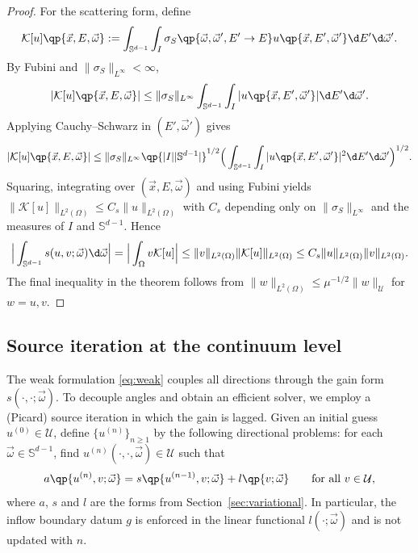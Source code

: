 \documentclass[final]{amsart}
\begin{document}
\begin{proof}
For the scattering form, define
\begin{equation*}
  \mathcal{K}[u]\qp{\vec{x},E,\vec{\omega}}
  :=
  \int_{\mathbb{S}^{d-1}}\int_I
  \sigma_S\qp{\vec{\omega},\vec{\omega}',E'\to E} 
  u\qp{\vec{x},E',\vec{\omega}'} \d E' \d\vec{\omega}'.
\end{equation*}
By Fubini and $\|\sigma_S\|_{L^\infty}<\infty$,
\begin{equation*}
  |\mathcal{K}[u]\qp{\vec{x},E,\vec{\omega}}|
  \le
  \|\sigma_S\|_{L^\infty}\int_{\mathbb{S}^{d-1}}\int_I
  |u\qp{\vec{x},E',\vec{\omega}'}| \d E' \d\vec{\omega}'.
\end{equation*}
Applying Cauchy--Schwarz in $(E',\vec{\omega}')$ gives
\[
  |\mathcal{K}[u]\qp{\vec{x},E,\vec{\omega}}|
  \le
  \|\sigma_S\|_{L^\infty} \qp{|I| |\mathbb S^{d-1}|}^{1/2}
  \Big(\int_{\mathbb{S}^{d-1}}\int_I |u\qp{\vec{x},E',\vec{\omega}'}|^2 \d E' \d\vec{\omega}'\Big)^{1/2}.
\]
Squaring, integrating over $(\vec{x},E,\vec{\omega})$ and using Fubini yields
$\|\mathcal{K}[u]\|_{L^2(\Omega)} \le C_s\|u\|_{L^2(\Omega)}$ with $C_s$ depending only on
$\|\sigma_S\|_{L^\infty}$ and the measures of $I$ and $\mathbb{S}^{d-1}$. Hence
\begin{equation*}
  \Big|\int_{\mathbb{S}^{d-1}} s(u,v;\vec{\omega}) \d\vec{\omega}\Big|
  =
  \Big|\int_\Omega v \mathcal{K}[u]\Big|
  \le
  \|v\|_{L^2(\Omega)}\|\mathcal{K}[u]\|_{L^2(\Omega)}
  \le
  C_s\|u\|_{L^2(\Omega)}\|v\|_{L^2(\Omega)}.
\end{equation*}
The final inequality in the theorem follows from $\|w\|_{L^2(\Omega)}\le \mu^{-1/2}\|w\|_{\mathcal{U}}$ for $w=u,v$.
\end{proof}

\subsection{Source iteration at the continuum level}
\label{sec:SI-continuum}

The weak formulation \eqref{eq:weak} couples all directions through the
gain form $s(\cdot,\cdot;\vec{\omega})$. To decouple angles and obtain
an efficient solver, we employ a (Picard) source iteration in which the
gain is lagged. Given an initial guess $u^{(0)}\in\mathcal{U}$, define
$\{u^{(n)}\}_{n\ge 1}$ by the following directional problems: for each
$\vec{\omega}\in\mathbb{S}^{d-1}$, find
$u^{(n)}(\cdot,\cdot,\vec{\omega})\in\mathcal{U}$ such that
\begin{equation}
  \label{eq:SI-weak}
  a\qp{u^{(n)},v;\vec{\omega}}
  =
  s\qp{u^{(n-1)},v;\vec{\omega}}
  +
  l\qp{v;\vec{\omega}}
  \qquad \text{for all } v\in\mathcal{U},
\end{equation}
where $a$, $s$ and $l$ are the forms from Section~\ref{sec:variational}.
In particular, the inflow boundary datum $g$ is enforced in the linear
functional $l(\cdot;\vec{\omega})$ and is not updated with $n$.
\end{document}
